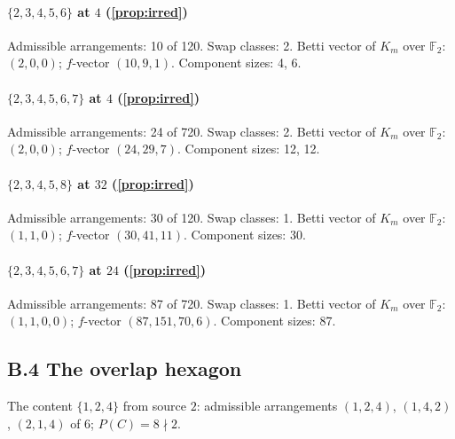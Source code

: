 \paragraph{$\{2,3,4,5,6\}$ at $4$ (\cref{prop:irred})}Admissible arrangements: 10 of 120. Swap classes: 2. Betti vector of $K_m$ over $\mathbb F_2$: $(2,0,0)$; $f$-vector $(10,9,1)$.
Component sizes: 4, 6.
\paragraph{$\{2,3,4,5,6,7\}$ at $4$ (\cref{prop:irred})}Admissible arrangements: 24 of 720. Swap classes: 2. Betti vector of $K_m$ over $\mathbb F_2$: $(2,0,0)$; $f$-vector $(24,29,7)$.
Component sizes: 12, 12.
\paragraph{$\{2,3,4,5,8\}$ at $32$ (\cref{prop:irred})}Admissible arrangements: 30 of 120. Swap classes: 1. Betti vector of $K_m$ over $\mathbb F_2$: $(1,1,0)$; $f$-vector $(30,41,11)$.
Component sizes: 30.
\paragraph{$\{2,3,4,5,6,7\}$ at $24$ (\cref{prop:irred})}Admissible arrangements: 87 of 720. Swap classes: 1. Betti vector of $K_m$ over $\mathbb F_2$: $(1,1,0,0)$; $f$-vector $(87,151,70,6)$.
Component sizes: 87.
\subsection*{B.4 The overlap hexagon}
The content $\{1,2,4\}$ from source $2$: admissible arrangements $(1,2,4)$, $(1,4,2)$, $(2,1,4)$ of 6; $P(C)=8\nmid 2$.
